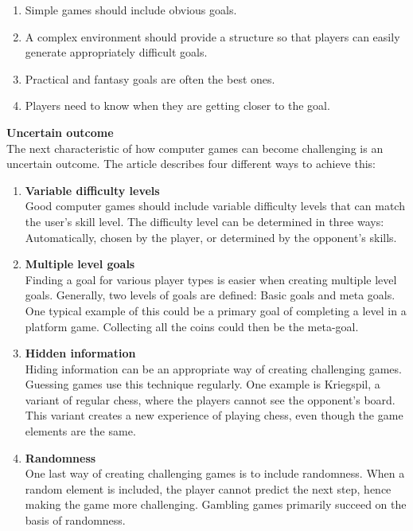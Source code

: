 \documentclass[../Main.tex]{subfiles}
\begin{document}
\begin{enumerate}
    \item Simple games should include obvious goals.
    \item A complex environment should provide a structure so that players can easily generate appropriately difficult goals.
    \item Practical and fantasy goals are often the best ones.
    \item Players need to know when they are getting closer to the goal.
\end{enumerate}

\textbf{Uncertain outcome} \\
The next characteristic of how computer games can become challenging is an uncertain outcome. The article describes four different ways to achieve this:

\begin{enumerate}
    \item \textbf{Variable difficulty levels}\\ 
    Good computer games should include variable difficulty levels that can match the user’s skill level. The difficulty level can be determined in three ways: Automatically, chosen by the player, or determined by the opponent’s skills.

    \item \textbf{Multiple level goals} \\ 
    Finding a goal for various player types is easier when creating multiple level goals. Generally, two levels of goals are defined: Basic goals and meta goals. One typical example of this could be a primary goal of completing a level in a platform game. Collecting all the coins could then be the meta-goal. 

    \item \textbf{Hidden information} \\
    Hiding information can be an appropriate way of creating challenging games. Guessing games use this technique regularly. One example is Kriegspil, a variant of regular chess, where the players cannot see the opponent's board. This variant creates a new experience of playing chess, even though the game elements are the same.

    \item \textbf{Randomness} \\
    One last way of creating challenging games is to include randomness. When a random element is included, the player cannot predict the next step, hence making the game more challenging. Gambling games primarily succeed on the basis of randomness.
\end{enumerate}
\end{document}
